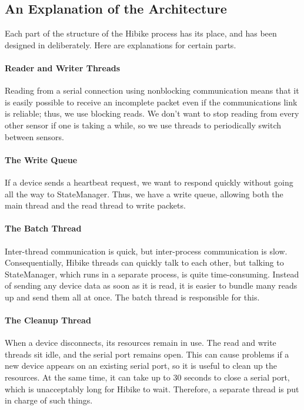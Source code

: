 \documentclass[12pt]{book}
\begin{document}
\subsection{An Explanation of the Architecture}
Each part of the structure of the Hibike process has its place, and has
been designed in deliberately. Here are explanations for certain parts.

\paragraph{Reader and Writer Threads}
Reading from a serial connection using nonblocking communication means that it
is easily possible to receive an incomplete packet even if the communications
link is reliable; thus, we use blocking reads. We don't want to stop reading
from every other sensor if one is taking a while, so we use threads to
periodically switch between sensors.

\paragraph{The Write Queue}
If a device sends a heartbeat request, we want to respond quickly
without going all the way to StateManager. Thus, we have a write queue, allowing
both the main thread and the read thread to write packets.

\paragraph{The Batch Thread}
Inter-thread communication is quick, but inter-process communication is slow.
Consequentially,
Hibike threads can quickly talk to each other, but talking to StateManager, which
runs in a separate process, is quite time-consuming. Instead of
sending any device data as soon as it is read, it is easier to bundle many
reads up and send them all at once. The batch thread is responsible for this.

\paragraph{The Cleanup Thread}
When a device disconnects, its resources remain in use. The read
and write threads sit idle, and the serial port remains open. This
can cause problems if a new device appears on an existing serial port,
so it is useful to clean up the resources. At the same time, it
can take up to 30 seconds to close a serial port, which is unacceptably
long for Hibike to wait. Therefore, a separate thread is put in charge
of such things.
\end{document}
